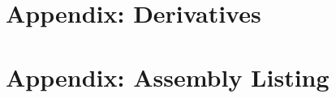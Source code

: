 \documentclass[cup9a]{cupbook}
\begin{document}

    
    \label{part:appendix}
    \chapter{Appendix: Derivatives}
     
    \chapter{Appendix: Assembly Listing}
\end{document}
